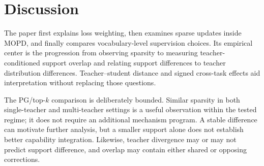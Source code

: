 \section{Discussion}
\label{sec:conclusion}

The paper first explains loss weighting, then examines sparse updates
inside MOPD, and finally compares vocabulary-level supervision choices. Its empirical
center is the progression from observing sparsity to measuring
teacher-conditioned support overlap and relating support differences
to teacher distribution differences. Teacher--student distance and
signed cross-task effects aid interpretation without replacing those
questions.

The PG/top-$k$ comparison is deliberately bounded. Similar sparsity
in both single-teacher and multi-teacher settings is a useful observation
within the tested regime; it does not require an additional mechanism
program. A stable difference can motivate further analysis, but a
smaller support alone does not establish better capability integration.
Likewise, teacher divergence may or may not predict support difference,
and overlap may contain either shared or opposing corrections.

